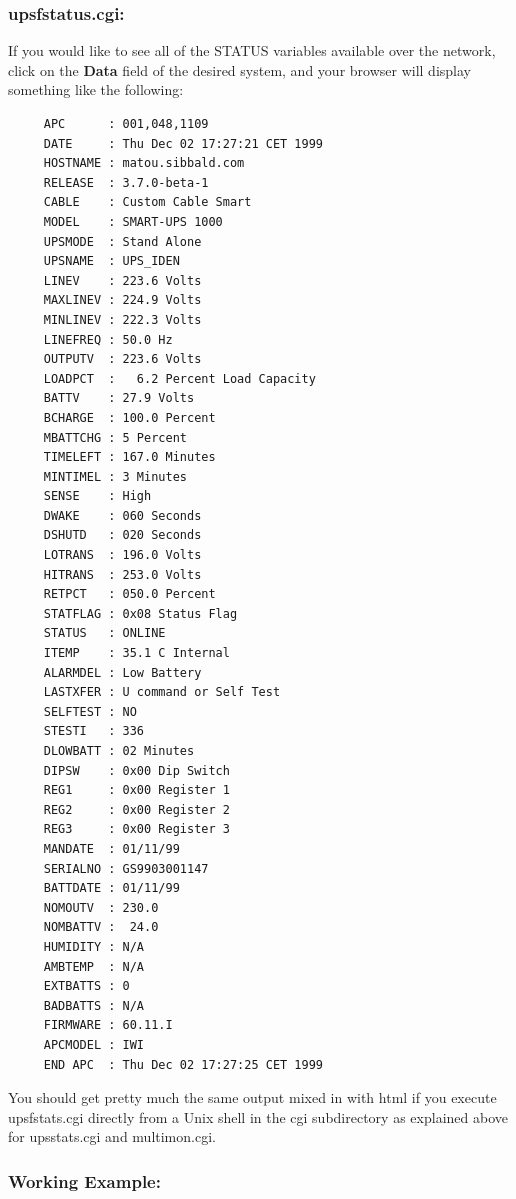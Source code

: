 {{{{{\label{upsfstatus_005fcgi}

\subsubsection*{upsfstatus.cgi:}

\label{index-upsfstatus-132}
\label{index-CGI_002c-upsfstatus-133}
If you would like to see all of the STATUS variables available over the
network, click on the {\bf Data} field of the desired system, and your browser
will display something like the following: 

\footnotesize
\begin{verbatim}
     APC      : 001,048,1109
     DATE     : Thu Dec 02 17:27:21 CET 1999
     HOSTNAME : matou.sibbald.com
     RELEASE  : 3.7.0-beta-1
     CABLE    : Custom Cable Smart
     MODEL    : SMART-UPS 1000
     UPSMODE  : Stand Alone
     UPSNAME  : UPS_IDEN
     LINEV    : 223.6 Volts
     MAXLINEV : 224.9 Volts
     MINLINEV : 222.3 Volts
     LINEFREQ : 50.0 Hz
     OUTPUTV  : 223.6 Volts
     LOADPCT  :   6.2 Percent Load Capacity
     BATTV    : 27.9 Volts
     BCHARGE  : 100.0 Percent
     MBATTCHG : 5 Percent
     TIMELEFT : 167.0 Minutes
     MINTIMEL : 3 Minutes
     SENSE    : High
     DWAKE    : 060 Seconds
     DSHUTD   : 020 Seconds
     LOTRANS  : 196.0 Volts
     HITRANS  : 253.0 Volts
     RETPCT   : 050.0 Percent
     STATFLAG : 0x08 Status Flag
     STATUS   : ONLINE
     ITEMP    : 35.1 C Internal
     ALARMDEL : Low Battery
     LASTXFER : U command or Self Test
     SELFTEST : NO
     STESTI   : 336
     DLOWBATT : 02 Minutes
     DIPSW    : 0x00 Dip Switch
     REG1     : 0x00 Register 1
     REG2     : 0x00 Register 2
     REG3     : 0x00 Register 3
     MANDATE  : 01/11/99
     SERIALNO : GS9903001147
     BATTDATE : 01/11/99
     NOMOUTV  : 230.0
     NOMBATTV :  24.0
     HUMIDITY : N/A
     AMBTEMP  : N/A
     EXTBATTS : 0
     BADBATTS : N/A
     FIRMWARE : 60.11.I
     APCMODEL : IWI
     END APC  : Thu Dec 02 17:27:25 CET 1999
\end{verbatim}
\normalsize

You should get pretty much the same output mixed in with html if you execute
upsfstats.cgi directly from a Unix shell in the cgi subdirectory as explained
above for upsstats.cgi and multimon.cgi. 

\label{Working-Example}

\subsubsection*{Working Example:}

}}}}}
